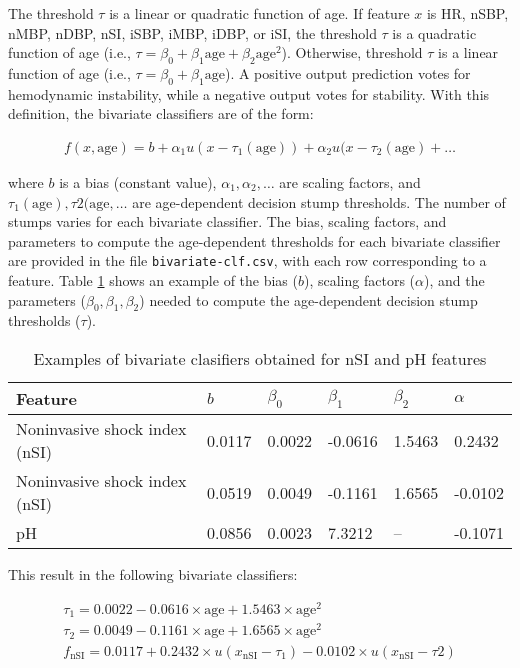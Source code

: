 \documentclass[
   technote
]{phildoc}
\newcommand{\ie}{i.e.,}
\begin{document}
The threshold $\tau$ is a linear or quadratic function of age. If feature $x$ is HR, nSBP, nMBP, nDBP, nSI, iSBP, iMBP, iDBP, or iSI, the threshold $\tau$ is a quadratic function of age (\ie{} $\tau=\beta_{0} + \beta_{1}\text{age} + \beta_{2}\text{age}^{2}$). Otherwise, threshold $\tau$ is a linear function of age (\ie{} $\tau=\beta_{0} + \beta_{1}\text{age}$). A positive output prediction votes for hemodynamic instability, while a negative output votes for stability. With this definition, the bivariate classifiers are of the form:

\begin{eqnarray}
f(x,\text{age}) = b + \alpha_{1}u(x-\tau_{1}(\text{age})) + \alpha_{2}u(x-\tau_{2}(\text{age})+\dots
\end{eqnarray}

where $b$ is a bias (constant value), $\alpha_{1},\alpha_{2},\dots$ are scaling factors, and $\tau_{1}(\text{age}), \tau{2}(\text{age}, \dots$ are age-dependent decision stump thresholds. The number of stumps varies for each bivariate classifier. The bias, scaling factors, and parameters to compute the age-dependent thresholds for each bivariate classifier are provided in the file \texttt{bivariate-clf.csv}, with each row corresponding to a feature. Table \ref{tab:bivariate_clf} shows an example of the bias ($b$), scaling factors ($\alpha$), and the parameters ($\beta_{0},\beta_{1}, \beta_{2}$) needed to compute the age-dependent decision stump thresholds ($\tau$).

\begin{table}
\center
\caption{Examples of bivariate clasifiers obtained for nSI and pH features}
\label{tab:bivariate_clf}
\begin{tabular}{|l|l|l|l|l|l|}
	\hline
	\textbf{Feature} & $b$ & $\beta_{0}$ & $\beta_{1}$ & $\beta_{2}$ & $\alpha$ \\
	\hline
	\hline
	Noninvasive shock index (nSI) &  0.0117 & 0.0022 & -0.0616	& 1.5463 & 0.2432 \\
	\hline
	Noninvasive shock index (nSI) &  0.0519 & 0.0049 & -0.1161	& 1.6565 & -0.0102 \\
	\hline
	pH	& 0.0856 & 0.0023 & 7.3212 & -- & -0.1071 \\
	\hline	
\end{tabular}
\end{table}


This result in the following bivariate classifiers:

\begin{eqnarray}
\tau_{1} = 0.0022 - 0.0616 \times \text{age} + 1.5463 \times \text{age}^{2} \\
\tau_{2} = 0.0049 - 0.1161 \times \text{age} + 1.6565 \times \text{age}^{2} \\
f_{\text{nSI}} = 0.0117 + 0.2432 \times u(x_{\text{nSI}}-\tau_{1}) - 0.0102 \times u(x_{\text{nSI}}-\tau{2})
\end{eqnarray}
\end{document}

